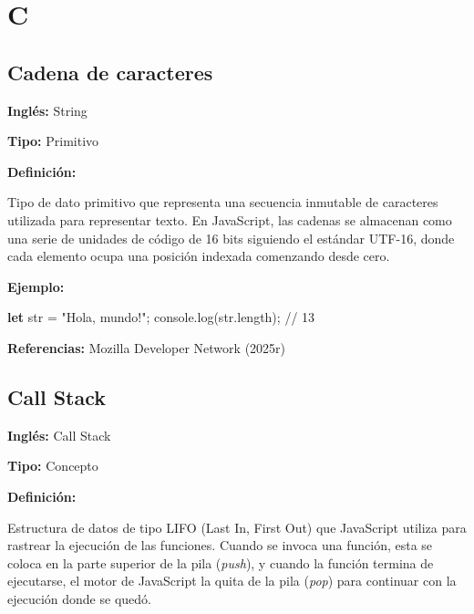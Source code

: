 \documentclass[
  letterpaper,
  DIV=11,
  numbers=noendperiod]{scrreprt}
\newenvironment{Shaded}{\begin{snugshade}}{\end{snugshade}}
\newcommand{\AttributeTok}[1]{\textcolor[rgb]{0.40,0.45,0.13}{#1}}
\newcommand{\BuiltInTok}[1]{\textcolor[rgb]{0.00,0.23,0.31}{#1}}
\newcommand{\CommentTok}[1]{\textcolor[rgb]{0.37,0.37,0.37}{#1}}
\newcommand{\FunctionTok}[1]{\textcolor[rgb]{0.28,0.35,0.67}{#1}}
\newcommand{\KeywordTok}[1]{\textcolor[rgb]{0.00,0.23,0.31}{\textbf{#1}}}
\newcommand{\NormalTok}[1]{\textcolor[rgb]{0.00,0.23,0.31}{#1}}
\newcommand{\OperatorTok}[1]{\textcolor[rgb]{0.37,0.37,0.37}{#1}}
\newcommand{\StringTok}[1]{\textcolor[rgb]{0.13,0.47,0.30}{#1}}
\let\oldsubsection\subsection
\renewcommand{\subsection}{\phantomsection\oldsubsection}
\begin{document}
\section*{C}\label{c}


\subsection*{Cadena de caracteres}\label{glos-cadena}

\textbf{Inglés:} String

\textbf{Tipo:} Primitivo

\textbf{Definición:}

Tipo de dato primitivo que representa una secuencia inmutable de
caracteres utilizada para representar texto. En JavaScript, las cadenas
se almacenan como una serie de unidades de código de 16 bits siguiendo
el estándar UTF-16, donde cada elemento ocupa una posición indexada
comenzando desde cero.

\textbf{Ejemplo:}

\begin{Shaded}
\begin{Highlighting}[]
\KeywordTok{let}\NormalTok{ str }\OperatorTok{=} \StringTok{"Hola, mundo!"}\OperatorTok{;}
\BuiltInTok{console}\OperatorTok{.}\FunctionTok{log}\NormalTok{(str}\OperatorTok{.}\AttributeTok{length}\NormalTok{)}\OperatorTok{;} \CommentTok{// 13}
\end{Highlighting}
\end{Shaded}

\textbf{Referencias:} Mozilla Developer Network (2025r)

\subsection*{Call Stack}\label{glos-call_stack}

\textbf{Inglés:} Call Stack

\textbf{Tipo:} Concepto

\textbf{Definición:}

Estructura de datos de tipo LIFO (Last In, First Out) que JavaScript
utiliza para rastrear la ejecución de las funciones. Cuando se invoca
una función, esta se coloca en la parte superior de la pila
(\emph{push}), y cuando la función termina de ejecutarse, el motor de
JavaScript la quita de la pila (\emph{pop}) para continuar con la
ejecución donde se quedó.
\end{document}
